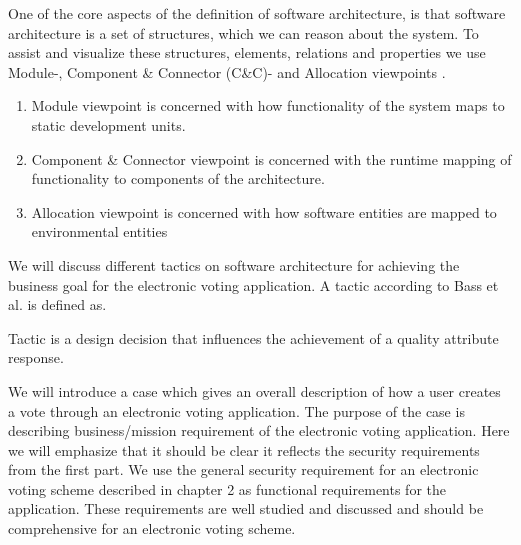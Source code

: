\noindent
One of the core aspects of the definition of software architecture, is that software architecture is a set of structures, which we can reason about the system. To assist and visualize these structures, elements, relations and properties we use Module-, Component \& Connector (C\&C)- and Allocation viewpoints \cite{3+1}. 

\begin{enumerate}
    \item Module viewpoint is concerned with how functionality of the system maps to static development units.
    \item Component \& Connector viewpoint is concerned with the runtime mapping of functionality to components of the architecture.
    \item Allocation viewpoint is concerned with how software entities are mapped to environmental entities
\end{enumerate}

\noindent
We will discuss different tactics on software architecture for achieving the business goal for the electronic voting application. A tactic according to Bass et al. is defined as.

\begin{defi}
Tactic is a design decision that influences the achievement of a quality attribute response. \cite{Bass}
\end{defi}

\noindent
We will introduce a case which gives an overall description of how a user creates a vote through an electronic voting application. The purpose of the case is describing business/mission requirement of the electronic voting application. Here we will emphasize that it should be clear it reflects the security requirements from the first part. We use the general security requirement for an electronic voting scheme described in chapter 2 as functional requirements for the application. These requirements are well studied and discussed and should be comprehensive for an electronic voting scheme.